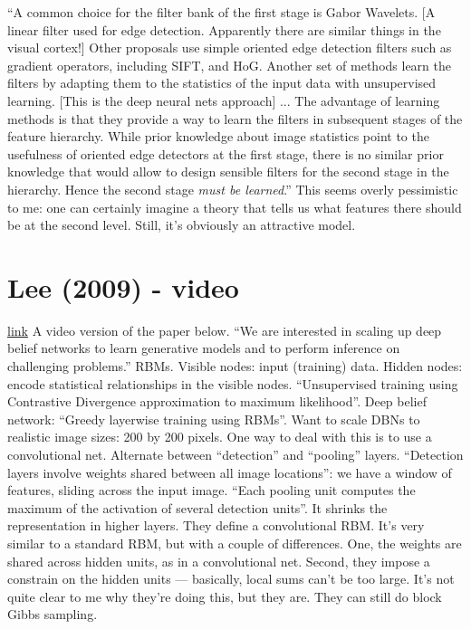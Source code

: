 \documentclass[12pt]{report}
\newcommand{\link}[2]{\href{#1}{#2}}
\begin{document}
``A common choice for the filter bank of the first stage is Gabor
Wavelets.  [A linear filter used for edge detection.  Apparently there
are similar things in the visual cortex!] Other proposals use simple
oriented edge detection filters such as gradient operators, including
SIFT, and HoG.  Another set of methods learn the filters by adapting
them to the statistics of the input data with unsupervised
learning. [This is the deep neural nets approach] ... The advantage of
learning methods is that they provide a way to learn the filters in
subsequent stages of the feature hierarchy.  While prior knowledge
about image statistics point to the usefulness of oriented edge
detectors at the first stage, there is no similar prior knowledge that
would allow to design sensible filters for the second stage in the
hierarchy.  Hence the second stage \emph{must be learned}.''  This
seems overly pessimistic to me: one can certainly imagine a theory
that tells us what features there should be at the second level.
Still, it's obviously an attractive model.


\section{Lee (2009) - video}

\link{http://videolectures.net/icml09\_lee\_cdb/}{link} A video
version of the paper below.  ``We are interested in scaling up deep
belief networks to learn generative models and to perform inference on
challenging problems.''  RBMs.  Visible nodes: input (training) data.
Hidden nodes: encode statistical relationships in the visible nodes.
``Unsupervised training using Contrastive Divergence approximation to
maximum likelihood''.  Deep belief network: ``Greedy layerwise
training using RBMs''.  Want to scale DBNs to realistic image sizes:
200 by 200 pixels.  One way to deal with this is to use a
convolutional net.  Alternate between ``detection'' and ``pooling''
layers.  ``Detection layers involve weights shared between all image
locations'': we have a window of features, sliding across the input
image.  ``Each pooling unit computes the maximum of the activation of
several detection units''.  It shrinks the representation in higher
layers.  They define a convolutional RBM.  It's very similar to a
standard RBM, but with a couple of differences.  One, the weights are
shared across hidden units, as in a convolutional net.  Second, they
impose a constrain on the hidden units --- basically, local sums can't
be too large.  It's not quite clear to me why they're doing this, but
they are.  They can still do block Gibbs sampling.  
\end{document}

